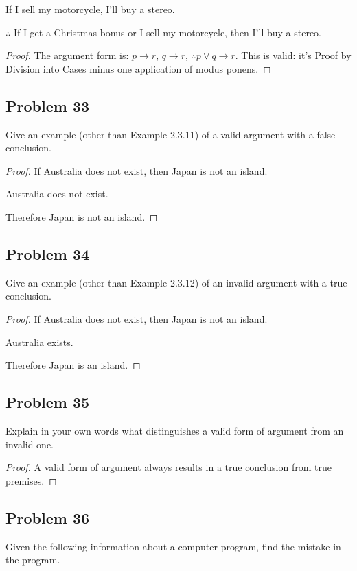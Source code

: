 \documentclass[14pt]{extarticle}
\begin{document}
If I sell my motorcycle, I’ll buy a stereo.

$\therefore$ If I get a Christmas bonus or I sell my motorcycle, then I’ll buy a
stereo.

\begin{proof}
The argument form is: $p \to r$, $q \to r$, $\therefore p \vee q \to r$. This is
valid: it's Proof by Division into Cases minus one application of modus ponens.
\end{proof}

\subsection{Problem 33}
Give an example (other than Example 2.3.11) of a valid argument with a false
conclusion.

\begin{proof}
If Australia does not exist, then Japan is not an island.

Australia does not exist.

Therefore Japan is not an island.
\end{proof}

\subsection{Problem 34}
Give an example (other than Example 2.3.12) of an invalid argument with a true
conclusion.

\begin{proof}
If Australia does not exist, then Japan is not an island.

Australia exists.

Therefore Japan is an island.
\end{proof}

\subsection{Problem 35}
Explain in your own words what distinguishes a valid form of argument from an
invalid one.

\begin{proof}
A valid form of argument always results in a true conclusion from true premises.\end{proof}

\subsection{Problem 36}
Given the following information about a computer program, find the mistake in
the program.
\end{document}
